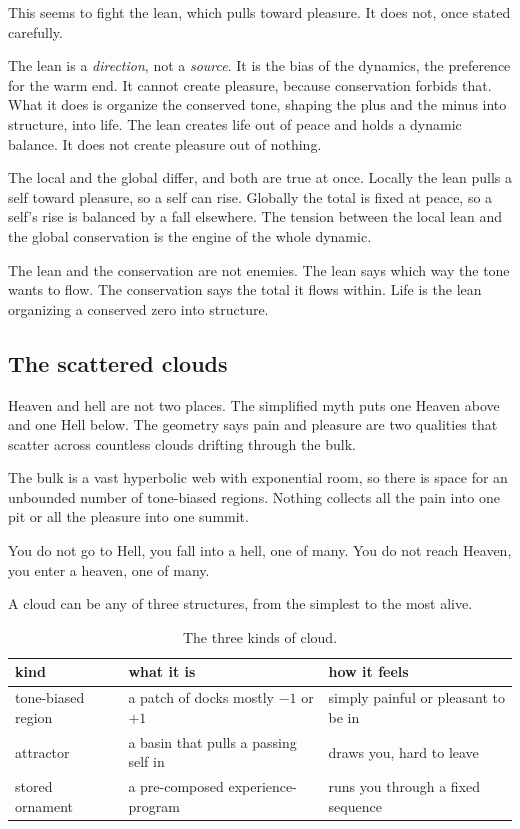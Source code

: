 This seems to fight the lean, which pulls toward pleasure. It does not, once stated carefully.

The lean is a \emph{direction}, not a \emph{source}. It is the bias of the dynamics, the preference for the warm end. It cannot create pleasure, because conservation forbids that. What it does is organize the conserved tone, shaping the plus and the minus into structure, into life. The lean creates life out of peace and holds a dynamic balance. It does not create pleasure out of nothing.

The local and the global differ, and both are true at once. Locally the lean pulls a self toward pleasure, so a self can rise. Globally the total is fixed at peace, so a self's rise is balanced by a fall elsewhere. The tension between the local lean and the global conservation is the engine of the whole dynamic.

\begin{proposition}
The lean and the conservation are not enemies. The lean says which way the tone wants to flow. The conservation says the total it flows within. Life is the lean organizing a conserved zero into structure.
\end{proposition}

\subsection{The scattered clouds}

Heaven and hell are not two places. The simplified myth puts one Heaven above and one Hell below. The geometry says pain and pleasure are two qualities that scatter across countless clouds drifting through the bulk.

The bulk is a vast hyperbolic web with exponential room, so there is space for an unbounded number of tone-biased regions. Nothing collects all the pain into one pit or all the pleasure into one summit.

\begin{result}
You do not go to Hell, you fall into a hell, one of many. You do not reach Heaven, you enter a heaven, one of many.
\end{result}

A cloud can be any of three structures, from the simplest to the most alive.

\begin{table}[ht]
\centering
\begin{tabular}{@{}lll@{}}
\toprule
kind & what it is & how it feels \\
\midrule
tone-biased region & a patch of docks mostly $-1$ or $+1$ & simply painful or pleasant to be in \\
attractor & a basin that pulls a passing self in & draws you, hard to leave \\
stored ornament & a pre-composed experience-program & runs you through a fixed sequence \\
\bottomrule
\end{tabular}
\caption{The three kinds of cloud.}
\label{tab:clouds}
\end{table}

